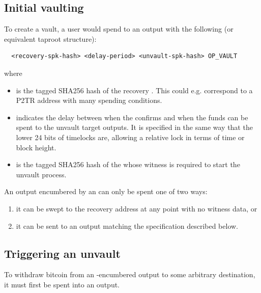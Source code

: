 \documentclass[10pt]{article}
\begin{document}
\subsection*{Initial vaulting}

To create a vault, a user would spend to an output with the following
\spk{} (or equivalent taproot structure):

\begin{verbatim}
  <recovery-spk-hash> <delay-period> <unvault-spk-hash> OP_VAULT
\end{verbatim}
\noindent where

\begin{itemize}
  \item {} is the tagged SHA256 hash of the recovery \spk{}. 
    This could e.g. correspond to a P2TR address with many spending conditions.

  \item {} indicates the delay between when the \opuv{} confirms
    and when the funds can be spent to the unvault target outputs. It is specified
    in the same way that the lower 24 bits of  timelocks are, allowing
    a relative lock in terms of time or block height.

  \item {} is the tagged SHA256 hash of the \spk{} whose 
    witness is required to start the unvault process.

\end{itemize}

An output encumbered by an \opv{} \spk{} can only be spent one of two ways: 

\begin{enumerate}
  \item it can be swept to the recovery address at any point with no witness data, or
  \item it can be sent to an \opuv{} output matching the specification described
    below.
\end{enumerate}



\subsection*{Triggering an unvault}

To withdraw bitcoin from an \opv{}-encumbered output to some arbitrary destination, it
must first be spent into an \opuv{} output.
\end{document}
